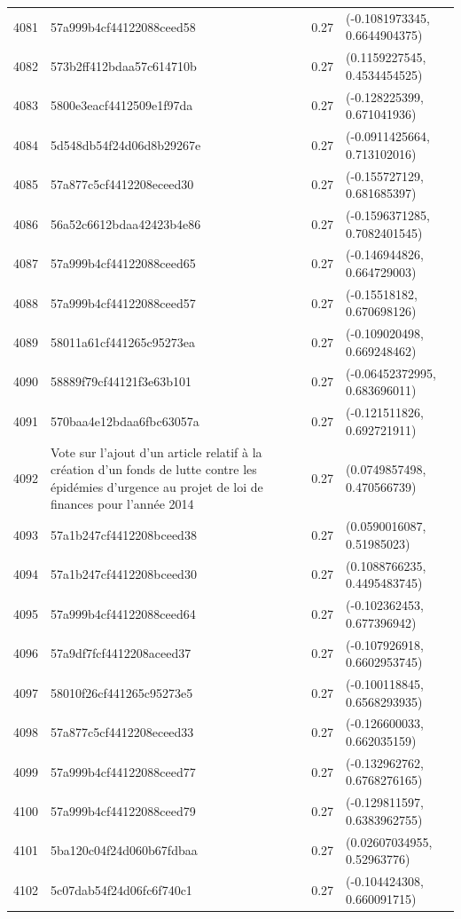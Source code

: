 \begin{table}[ht]
\begin{tabular}{rlrl}
  4081 & 57a999b4cf44122088ceed58 & 0.27 & (-0.1081973345, 0.6644904375) \\ 
  4082 & 573b2ff412bdaa57c614710b & 0.27 & (0.1159227545, 0.4534454525) \\ 
  4083 & 5800e3eacf4412509e1f97da & 0.27 & (-0.128225399, 0.671041936) \\ 
  4084 & 5d548db54f24d06d8b29267e & 0.27 & (-0.0911425664, 0.713102016) \\ 
  4085 & 57a877c5cf4412208eceed30 & 0.27 & (-0.155727129, 0.681685397) \\ 
  4086 & 56a52c6612bdaa42423b4e86 & 0.27 & (-0.1596371285, 0.7082401545) \\ 
  4087 & 57a999b4cf44122088ceed65 & 0.27 & (-0.146944826, 0.664729003) \\ 
  4088 & 57a999b4cf44122088ceed57 & 0.27 & (-0.15518182, 0.670698126) \\ 
  4089 & 58011a61cf441265c95273ea & 0.27 & (-0.109020498, 0.669248462) \\ 
  4090 & 58889f79cf44121f3e63b101 & 0.27 & (-0.06452372995, 0.683696011) \\ 
  4091 & 570baa4e12bdaa6fbc63057a & 0.27 & (-0.121511826, 0.692721911) \\ 
  4092 & Vote sur l'ajout d'un article relatif à la création d'un fonds de lutte contre les épidémies d'urgence au projet de loi de finances pour l'année 2014 & 0.27 & (0.0749857498, 0.470566739) \\ 
  4093 & 57a1b247cf4412208bceed38 & 0.27 & (0.0590016087, 0.51985023) \\ 
  4094 & 57a1b247cf4412208bceed30 & 0.27 & (0.1088766235, 0.4495483745) \\ 
  4095 & 57a999b4cf44122088ceed64 & 0.27 & (-0.102362453, 0.677396942) \\ 
  4096 & 57a9df7fcf4412208aceed37 & 0.27 & (-0.107926918, 0.6602953745) \\ 
  4097 & 58010f26cf441265c95273e5 & 0.27 & (-0.100118845, 0.6568293935) \\ 
  4098 & 57a877c5cf4412208eceed33 & 0.27 & (-0.126600033, 0.662035159) \\ 
  4099 & 57a999b4cf44122088ceed77 & 0.27 & (-0.132962762, 0.6768276165) \\ 
  4100 & 57a999b4cf44122088ceed79 & 0.27 & (-0.129811597, 0.6383962755) \\ 
  4101 & 5ba120c04f24d060b67fdbaa & 0.27 & (0.02607034955, 0.52963776) \\ 
  4102 & 5c07dab54f24d06fc6f740c1 & 0.27 & (-0.104424308, 0.660091715) \\ 

\end{tabular}
\end{table}

